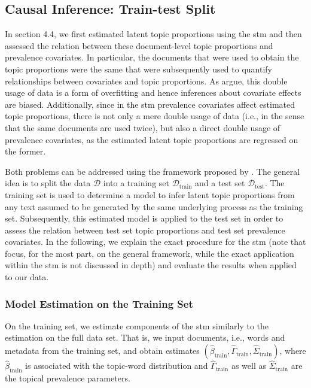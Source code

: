 \subsection{Causal Inference: Train-test Split}

In section 4.4, we first estimated latent topic proportions using the stm and then assessed the relation between these document-level topic proportions and prevalence covariates. In particular, the documents that were used to obtain the topic proportions were the same that were subsequently used to quantify relationships between covariates and topic proportions. As \cite{egami2018make} argue, this double usage of data is a form of overfitting and hence inferences about covariate effects are biased. Additionally, since in the stm prevalence covariates affect estimated topic proportions, there is not only a mere double usage of data (i.e., in the sense that the same documents are used twice), but also a direct double usage of prevalence covariates, as the estimated latent topic proportions are regressed on the former.

Both problems can be addressed using the framework proposed by \cite{egami2018make}. The general idea is to split the data $\mathcal{D}$ into a training set $\mathcal{D}_{\text{train}}$ and a test set $\mathcal{D}_{\text{test}}$. The training set is used to determine a model to infer latent topic proportions from any text assumed to be generated by the same underlying process as the training set. Subsequently, this estimated model is applied to the test set in order to assess the relation between test set topic proportions and test set prevalence covariates. In the following, we explain the exact procedure for the stm (note that \cite{egami2018make} focus, for the most part, on the general framework, while the exact application within the stm is not discussed in depth) and evaluate the results when applied to our data. 

\subsubsection{Model Estimation on the Training Set}

On the training set, we estimate components of the stm similarly to the estimation on the full data set. That is, we input documents, i.e., words and metadata from the training set, and obtain estimates $(\hat{\beta}_{\text{train}}, \hat{\Gamma}_{\text{train}}, \hat{\Sigma}_{\text{train}})$, where $\hat{\beta}_{\text{train}}$ is associated with the topic-word distribution and $\hat{\Gamma}_{\text{train}}$ as well as $\hat{\Sigma}_{\text{train}}$ are the topical prevalence parameters. 

